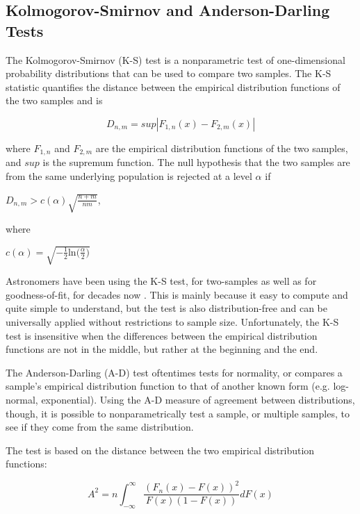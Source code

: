 \documentclass[fleqn,usenatbib]{mnras}
\begin{document}
\subsection{Kolmogorov-Smirnov and Anderson-Darling Tests}
\label{ssec: ks_ad}

The Kolmogorov-Smirnov (K-S) test is a nonparametric test of one-dimensional probability distributions that can be used to compare two samples. The K-S statistic quantifies the distance between the empirical distribution functions of the two samples and is 

\begin{equation}
    D_{n,m} = sup |F_{1,n}(x)-F_{2,m}(x)|
\end{equation}

\noindent where $F_{1,n}$ and $F_{2,m}$ are the empirical distribution functions of the two samples, and $sup$ is the supremum function. The null hypothesis that the two samples are from the same underlying population is rejected at a level $\alpha$ if

\begin{center}
$D_{n,m}> c(\alpha)\sqrt{\frac{n+m}{nm}}$, 

where

$c(\alpha) =\sqrt{-\frac{1}{2} \textrm{ln} \Big ( \frac{\alpha}{2} \Big )}$
\end{center}

Astronomers have been using the K-S test, for two-samples as well as for goodness-of-fit, for decades now \citep[e.g., ][]{peacock1983two}. This is mainly because it easy to compute and quite simple to understand, but the test is also distribution-free and can be universally applied without restrictions to sample size. Unfortunately, the K-S test is insensitive when the differences between the empirical distribution functions are not in the middle, but rather at the beginning and the end.

The Anderson-Darling (A-D) test oftentimes tests for normality, or compares a sample's empirical distribution function to that of another known form (e.g. log-normal, exponential). Using the A-D measure of agreement between distributions, though, it is possible to nonparametrically test a sample, or multiple samples, to see if they come from the same distribution.

The test is based on the distance between the two empirical distribution functions:

\begin{equation}
    A^2 = n \int^{\infty}_{-\infty} \frac{(F_n(x)-F(x))^2}{F(x)(1-F(x))}dF(x)
\end{equation}
\end{document}
